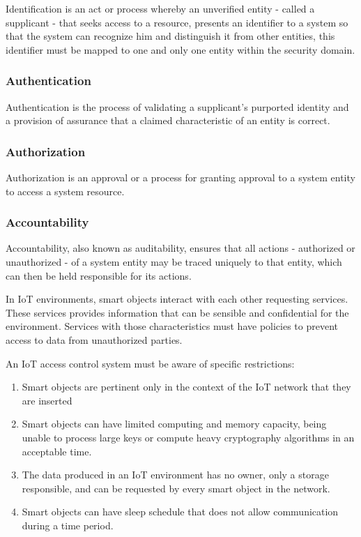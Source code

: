 \documentclass[letterpaper,conference]{IEEEtran}
\begin{document}
Identification is an act or process whereby an unverified entity - called a supplicant - that seeks access to 
a resource, presents an identifier to a system so that the system can recognize him and distinguish it from 
other entities, this identifier must be mapped to one and only one entity within the security 
domain.

\subsubsection{Authentication}

Authentication is the process of validating a supplicant’s purported identity and a provision of assurance that a 
claimed characteristic of an entity is correct.

\subsubsection{Authorization}

Authorization is an approval or a process for granting approval to a system 
entity to access a system resource.

\subsubsection{Accountability}
Accountability, also known as auditability, ensures that all actions - authorized or unauthorized - of a 
system entity may be traced uniquely to that entity, which can then be held responsible for 
its actions. 

In IoT environments, smart objects interact with each other requesting services. These services provides
information that can be sensible and confidential for the environment. Services with those characteristics
must have policies to prevent access to data from unauthorized parties.

An IoT access control system must be aware of specific restrictions:
\begin{enumerate}  
\item Smart objects are pertinent only in the context of the IoT network that they are inserted
\item Smart objects can have limited computing and memory capacity, being unable to process large keys or 
compute heavy cryptography algorithms in an acceptable time.
\item The data produced in an IoT environment has no owner, only a storage responsible, and can be requested
by every smart object in the network.
\item Smart objects can have sleep schedule that does not allow communication during a time period.
\end{enumerate}
\end{document}
